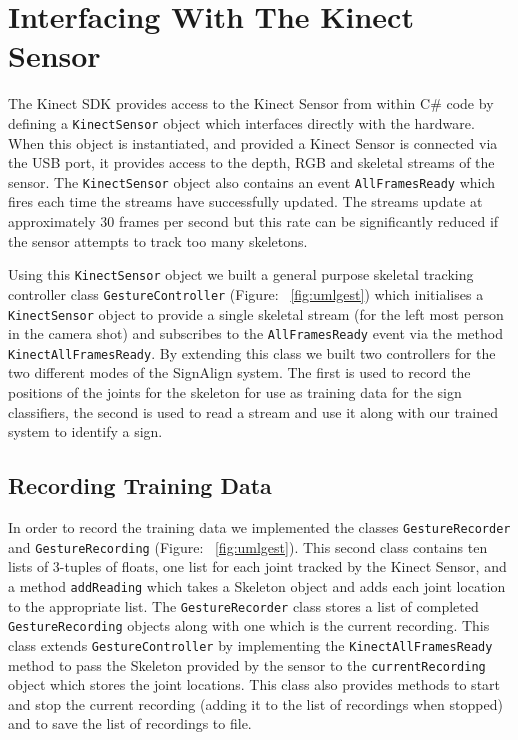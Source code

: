 \chapter{Interfacing With The Kinect Sensor}
\ifpdf
    \graphicspath{{Chapter3/Chapter3Figs/PNG/}{Chapter3/Chapter3Figs/PDF/}{Chapter3/Chapter3Figs/}}
\else
    \graphicspath{{Chapter3/Chapter3Figs/EPS/}{Chapter3/Chapter3Figs/}}
\fi


The Kinect SDK provides access to the Kinect Sensor from within C\# code by defining a \verb|KinectSensor| object which interfaces directly with the hardware. When this object is instantiated, and provided a Kinect Sensor is connected via the USB port, it provides access to the depth, RGB and skeletal streams of the sensor. The \verb|KinectSensor| object also contains an event  \verb|AllFramesReady| which fires each time the streams have successfully updated. The streams update at approximately 30 frames per second but this rate can be significantly reduced if the sensor attempts to track too many skeletons.

Using this \verb|KinectSensor| object we built a general purpose skeletal tracking controller class \verb|GestureController| (Figure: ~\ref{fig:umlgest}) which initialises a \verb|KinectSensor| object to provide a single skeletal stream (for the left most person in the camera shot) and subscribes to the \verb|AllFramesReady| event via the method \verb|KinectAllFramesReady|. By extending this class we built two controllers for the two different modes of the SignAlign system. The first is used to record the positions of the joints for the skeleton for use as training data for the sign classifiers, the second is used to read a stream and use it along with our trained system to identify a sign.

\section{Recording Training Data}
In order to record the training data we implemented the classes \verb|GestureRecorder| and \verb|GestureRecording| (Figure: ~\ref{fig:umlgest}). This second class contains ten lists of 3-tuples of floats, one list for each joint tracked by the Kinect Sensor, and a method \verb|addReading| which takes a Skeleton object and adds each joint location to the appropriate list. The \verb|GestureRecorder| class stores a list of completed \verb|GestureRecording| objects along with one which is the current recording. This class extends \verb|GestureController| by implementing the \verb|KinectAllFramesReady| method to pass the Skeleton provided by the sensor to the \verb|currentRecording| object which stores the joint locations. This class also provides methods to start and stop the current recording (adding it to the list of recordings when stopped) and to save the list of recordings to file.



